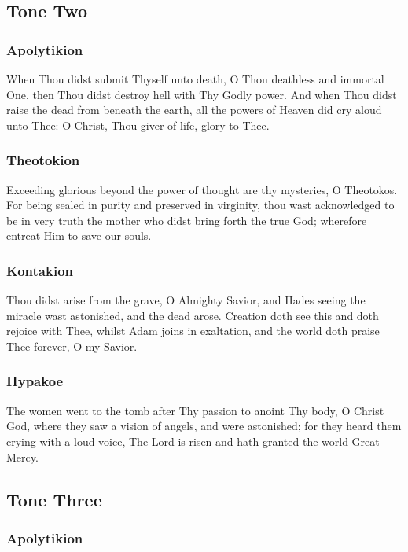 \subsection{Tone Two}

\subsubsection{Apolytikion}

When Thou didst submit Thyself unto death, O Thou deathless and immortal One, then Thou didst destroy hell with Thy Godly power. And when Thou didst raise the dead from beneath the earth, all the powers of Heaven did cry aloud unto Thee: O Christ, Thou giver of life, glory to Thee.

\subsubsection{Theotokion}

Exceeding glorious beyond the power of thought are thy mysteries, O Theotokos. For being sealed in purity and preserved in virginity, thou wast acknowledged to be in very truth the mother who didst bring forth the true God; wherefore entreat Him to save our souls.

\subsubsection{Kontakion}

Thou didst arise from the grave, O Almighty Savior, and Hades seeing the miracle wast astonished, and the dead arose. Creation doth see this and doth rejoice with Thee, whilst Adam joins in exaltation, and the world doth praise Thee forever, O my Savior.

\subsubsection{Hypakoe}

The women went to the tomb after Thy passion to anoint Thy body, O Christ God, where they saw a vision of angels, and were astonished; for they heard them crying with a loud voice, The Lord is risen and hath granted the world Great Mercy.

\subsection{Tone Three}

\subsubsection{Apolytikion}

